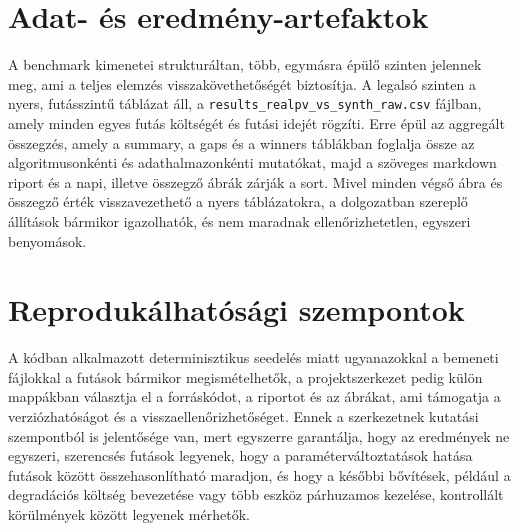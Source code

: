 \section{Adat- és eredmény-artefaktok}
A benchmark kimenetei strukturáltan, több, egymásra épülő szinten jelennek meg, ami a teljes elemzés visszakövethetőségét biztosítja. A legalsó szinten a nyers, futásszintű táblázat áll, a \texttt{results\_realpv\_vs\_synth\_raw.csv} fájlban, amely minden egyes futás költségét és futási idejét rögzíti. Erre épül az aggregált összegzés, amely a summary, a gaps és a winners táblákban foglalja össze az algoritmusonkénti és adathalmazonkénti mutatókat, majd a szöveges markdown riport és a napi, illetve összegző ábrák zárják a sort. Mivel minden végső ábra és összegző érték visszavezethető a nyers táblázatokra, a dolgozatban szereplő állítások bármikor igazolhatók, és nem maradnak ellenőrizhetetlen, egyszeri benyomások.

\section{Reprodukálhatósági szempontok}
A kódban alkalmazott determinisztikus seedelés miatt ugyanazokkal a bemeneti fájlokkal a futások bármikor megismételhetők, a projektszerkezet pedig külön mappákban választja el a forráskódot, a riportot és az ábrákat, ami támogatja a verziózhatóságot és a visszaellenőrizhetőséget. Ennek a szerkezetnek kutatási szempontból is jelentősége van, mert egyszerre garantálja, hogy az eredmények ne egyszeri, szerencsés futások legyenek, hogy a paraméterváltoztatások hatása futások között összehasonlítható maradjon, és hogy a későbbi bővítések, például a degradációs költség bevezetése vagy több eszköz párhuzamos kezelése, kontrollált körülmények között legyenek mérhetők.

